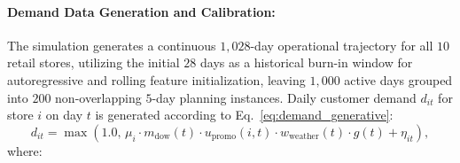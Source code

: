 \documentclass[11pt,a4paper]{article}
\theoremstyle{definition}
\theoremstyle{remark}
\begin{document}
\paragraph{Demand Data Generation and Calibration:}
The simulation generates a continuous $1{,}028$-day operational trajectory for all $10$ retail stores, utilizing the initial $28$ days as a historical burn-in window for autoregressive and rolling feature initialization, leaving $1{,}000$ active days grouped into $200$ non-overlapping $5$-day planning instances. Daily customer demand $d_{it}$ for store $i$ on day $t$ is generated according to Eq.~\eqref{eq:demand_generative}:
\begin{equation}
    d_{it} = \max\left(1.0, \, \mu_i \cdot m_{\text{dow}}(t) \cdot u_{\text{promo}}(i, t) \cdot w_{\text{weather}}(t) \cdot g(t) + \eta_{it}\right), \label{eq:demand_generative}
\end{equation}
where:
\end{document}
